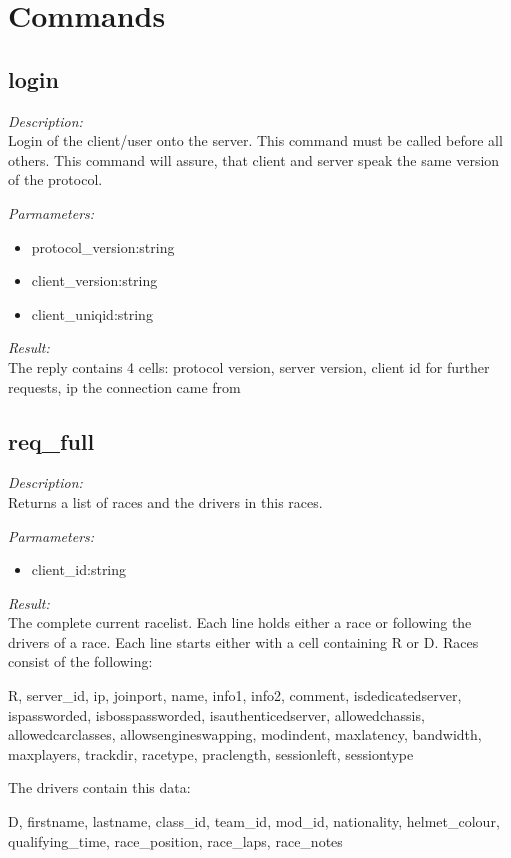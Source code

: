 \section{Commands}

\subsection{login}

\begin{description}
\item {\it Description:}\\
Login of the client/user onto the server. This command must be called before all others. This command will assure, that client and server speak the same version of the protocol.
\item {\it Parmameters:}
\begin{itemize}
\item protocol\_version:string
\item client\_version:string
\item client\_uniqid:string
\end{itemize}
\item {\it Result:}\\
The reply contains 4 cells: protocol version, server version, client id for further requests, ip the connection came from
\end{description}

\subsection{req\_full}

\begin{description}
\item {\it Description:}\\
Returns a list of races and the drivers in this races.
\item {\it Parmameters:}
\begin{itemize}
\item client\_id:string
\end{itemize}
\item {\it Result:}\\
The complete current racelist. Each line holds either a race or following the drivers of a race. Each line starts either with a cell containing R or D. Races consist of the following: 
			
		R, 
		server\_id, 
		ip, 
		joinport, 
		name, 
		info1, 
		info2, 
		comment, 
		isdedicatedserver, 
		ispassworded, 
		isbosspassworded, 
		isauthenticedserver, 
		allowedchassis, 
		allowedcarclasses, 
		allowsengineswapping, 
		modindent, 
		maxlatency, 
		bandwidth, 
		maxplayers, 
		trackdir, 
		racetype, 
		praclength, 
		sessionleft, 
		sessiontype


		The drivers contain this data:

		D,
		firstname,
		lastname,
		class\_id,
		team\_id,
		mod\_id,
		nationality,
		helmet\_colour,
		qualifying\_time,
		race\_position,
		race\_laps,
		race\_notes
		
\end{description}

